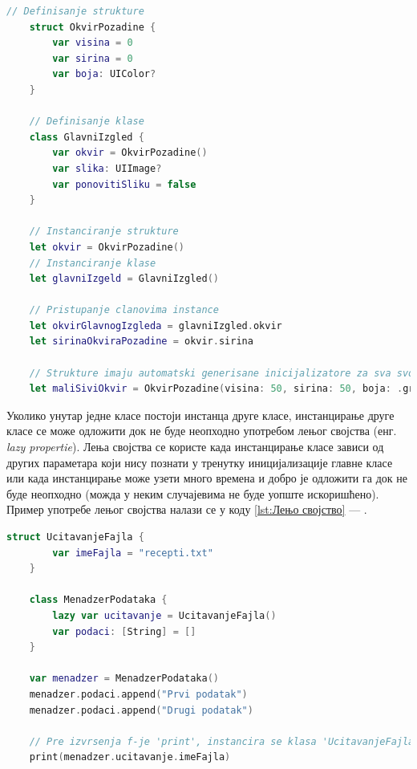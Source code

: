 \documentclass[12pt,oneside]{memoir}
\begin{document}
\begin{lstlisting}[caption=\textit{{Дефинисање класе и структуре}}, label={lst:Дефинисање класе и структуре}, language=Swift, frame=single]
    // Definisanje strukture
    struct OkvirPozadine {
        var visina = 0
        var sirina = 0
        var boja: UIColor?
    }
    
    // Definisanje klase
    class GlavniIzgled {
        var okvir = OkvirPozadine()
        var slika: UIImage?
        var ponovitiSliku = false
    }
    
    // Instanciranje strukture
    let okvir = OkvirPozadine()
    // Instanciranje klase
    let glavniIzgeld = GlavniIzgled()
    
    // Pristupanje clanovima instance
    let okvirGlavnogIzgleda = glavniIzgled.okvir
    let sirinaOkviraPozadine = okvir.sirina
    
    // Strukture imaju automatski generisane inicijalizatore za sva svojstva
    let maliSiviOkvir = OkvirPozadine(visina: 50, sirina: 50, boja: .gray)
\end{lstlisting}

\indent Уколико унутар једне класе постоји инстанца друге класе, инстанцирање друге класе се може одложити док не буде неопходно употребом лењог својства (енг. \textit{lazy propertie}). Лења својства се користе када инстанцирање класе зависи од других параметара који нису познати у тренутку иницијализације главне класе или када инстанцирање може узети много времена и добро је одложити га док не буде неопходно (можда у неким случајевима не буде уопште искоришћено). Пример употребе лењог својства налази се у коду \ref{lst:Лењо својство} --- .

\begin{lstlisting}[caption=\textit{{Лењо својство}}, label={lst:Лењо својство}, language=Swift, frame=single]
    struct UcitavanjeFajla {
        var imeFajla = "recepti.txt"
    }
    
    class MenadzerPodataka {
        lazy var ucitavanje = UcitavanjeFajla()
        var podaci: [String] = []
    }
    
    var menadzer = MenadzerPodataka()
    menadzer.podaci.append("Prvi podatak")
    menadzer.podaci.append("Drugi podatak")
    
    // Pre izvrsenja f-je 'print', instancira se klasa 'UcitavanjeFajla'
    print(menadzer.ucitavanje.imeFajla)
\end{lstlisting}
\end{document}
